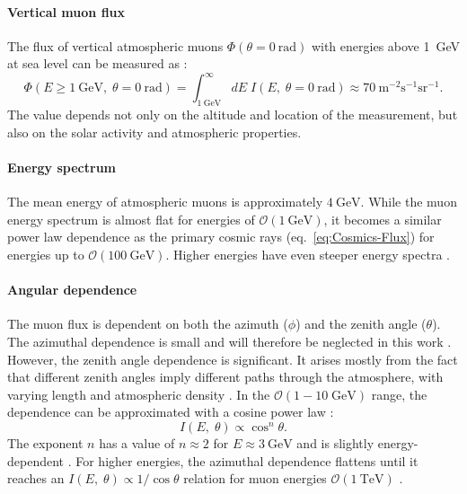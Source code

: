 \paragraph{Vertical muon flux}
The flux of vertical atmospheric muons $\Phi(\theta=\SI{0}{\radian})$ with energies above \SI{1}{\giga\electronvolt} at sea level can be measured as \cite{PDG2022,Book-Grieder}:
\begin{equation}
    \Phi(E \geq \SI{1}{\giga\electronvolt},\;\theta=\SI{0}{\radian}) = \int_{\SI{1}{\giga\electronvolt}}^{\infty}dE\; I(E,\;\theta=\SI{0}{\radian})\approx\SI{70}{\meter^{-2} \second^{-1} \steradian^{-1}}.
    \label{eq:CosmicMuon-VerticalFlux}
\end{equation}
The value depends not only on the altitude and location of the measurement, but also on the solar activity and atmospheric properties. %
\paragraph{Energy spectrum}
The mean energy of atmospheric muons is approximately $\SI{4}{\giga\electronvolt}$. While the muon energy spectrum is almost flat for energies of $\mathcal{O}(\SI{1}{\giga\electronvolt})$, it becomes a similar power law dependence as the primary cosmic rays (eq.\ \ref{eq:Cosmics-Flux}) for energies up to $\mathcal{O}(\SI{100}{\giga\electronvolt})$. Higher energies have even steeper energy spectra \cite{PDG2022}.
\paragraph{Angular dependence}
The muon flux is dependent on both the azimuth ($\phi$) and the zenith angle ($\theta$). The azimuthal dependence is small and will therefore be neglected in this work \cite{CosmicMuon-Shukla,Book-Grieder}. However, the zenith angle dependence is significant. It arises mostly from the fact that different zenith angles imply different paths through the atmosphere, with varying length and atmospheric density \cite{Book-Grieder}. In the $\mathcal{O}(1-10\;\si{\giga\electronvolt})$ range, the dependence can be approximated with a cosine power law \cite{PDG2022,CosmicMuon-Cecchini}:
\begin{equation}
    I(E,\;\theta)\propto \cos^n\theta.
    \label{eq:CosmicMuon-ZenithDependence}
\end{equation}
The exponent $n$ has a value of $n\approx 2$ for $E\approx\SI{3}{\giga\electronvolt}$ and is slightly energy-dependent \cite{PDG2022}. For higher energies, the azimuthal dependence flattens until it reaches an $I(E,\;\theta)\propto 1/\cos\theta$ relation for muon energies $\mathcal{O}(\SI{1}{\tera\electronvolt})$ \cite{CosmicMuon-Cecchini}.
